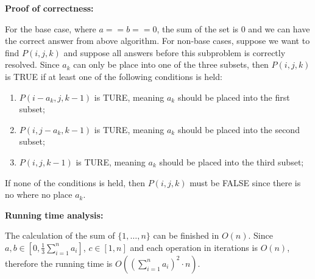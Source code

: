 \documentclass{article}
\begin{document}
{\par\textbf{Proof of correctness: }
\par For the base case, where $a == b == 0$, the sum of the set is $0$ and we can have the correct answer from above algorithm. For non-base cases, suppose we want to find $P(i,j,k)$ and suppose all answers before this subproblem is correctly resolved. Since $a_k$ can only be place into one of the three subsets, then $P(i,j,k)$ is TRUE if at least one of the following conditions is held:
	\begin{enumerate}
		\item $P(i-a_k,j,k-1)$ is TURE, meaning $a_k$ should be placed into the first subset;
		\item $P(i,j-a_k,k-1)$ is TURE, meaning $a_k$ should be placed into the second subset;
		\item $P(i,j,k-1)$ is TURE, meaning $a_k$ should be placed into the third subset;
	\end{enumerate}
\par If none of the conditions is held, then $P(i,j,k)$ must be FALSE since there is no where no place $a_k$.\\

\par\textbf{Running time analysis: }
\par The calculation of the sum of $\{1,\ldots,n\}$ can be finished in $O(n)$. Since $a,b \in[0, \frac{1}{3}\sum\limits_{i=1}^{n}{a_i}] $, $c \in [1,n]$ and each operation in iterations is $O(n)$, therefore the running time is $O((\sum\limits_{i=1}^{n}{a_i})^2\cdot n)$.
}
\pagebreak
\end{document}

